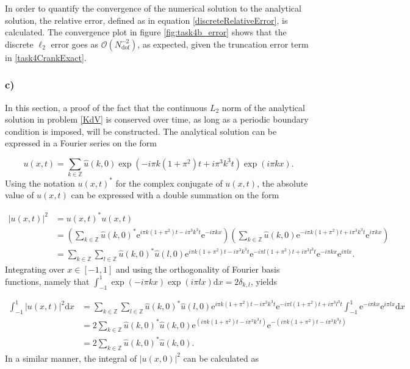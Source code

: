 In order to quantify the convergence of the numerical solution to the analytical solution, the relative error, defined as in equation \eqref{discreteRelativeError}, is calculated. The convergence plot in figure \ref{fig:task4b_error} shows that the discrete $\ell_2$ error goes as $\mathcal{O}(N_{\mathrm{dof}}^{-2})$, as expected, given the truncation error term in \eqref{task4CrankExact}.

\subsubsection{c)}
In this section, a proof of the fact that the continuous $L_2$ norm of the analytical solution in problem \eqref{KdV} is conserved over time, as long as a periodic boundary condition is imposed, will be constructed. The analytical solution can be expressed in a Fourier series on the form

\begin{equation*}
    u(x,t) = \sum_{k \in \mathbb{Z}}\widehat{u}(k,0)\exp{(-i\pi k(1+\pi^2)t + i\pi^3k^3t)}\exp{(i\pi kx)}.
\end{equation*}
Using the notation $u(x,t)^*$ for the complex conjugate of $u(x,t)$, the absolute value of $u(x,t)$ can be expressed with a double summation on the form 

\begin{equation*}
    \begin{split}
        |u(x,t)|^2 &= u(x,t)^* u(x,t) \\ &= \left(\sum_{k \in \mathbb{Z}}\widehat{u}(k,0)^* \mathrm{e}^{i\pi k(1+\pi^2)t - i\pi^3 k^3 t}\mathrm{e}^{-i\pi kx}\right) \left(\sum_{k \in \mathbb{Z}}\widehat{u}(k,0) \mathrm{e}^{-i\pi k(1+\pi^2)t +i\pi^3 k^3t}\mathrm{e}^{i\pi kx}\right) \\ &= \sum_{k\in \mathbb{Z}}\sum_{l \in \mathbb{Z}} \widehat{u}(k,0)^*\widehat{u}(l,0) \mathrm{e}^{i\pi k(1+\pi^2)t-i\pi^3 k^3t}\mathrm{e}^{-i\pi l(1+\pi^2)t+i\pi^3 l^3t }\mathrm{e}^{-i\pi kx}\mathrm{e}^{i\pi lx}.
    \end{split}
\end{equation*}
Integrating over $x \in [-1,1]$ and using the orthogonality of Fourier basis functions, namely that $\int_{-1}^{1} \exp{(-i\pi kx)}\exp{(i\pi lx)} \mathrm{d}x =2\delta_{k,l}$, yields

\begin{equation*}
    \begin{split}
        \int_{-1}^{1} |u(x,t)|^2 \mathrm{d}x &= \sum_{k\in \mathbb{Z}}\sum_{l \in \mathbb{Z}} \widehat{u}(k,0)^*\widehat{u}(l,0) \mathrm{e}^{i\pi k(1+\pi^2)t-i\pi^3 k^3t}\mathrm{e}^{-i\pi l(1+\pi^2)t+i\pi^3 l^3t } \int_{-1}^{1} \mathrm{e}^{-i\pi kx}\mathrm{e}^{i\pi lx} \mathrm{d}x \\ &= 2\sum_{k \in \mathbb{Z}} \widehat{u}(k,0)^*\widehat{u}(k,0) \mathrm{e}^{(i\pi k(1+\pi^2)t-i\pi^3 k^3t)} \mathrm{e}^{-(i\pi k(1+\pi^2)t-i\pi^3 k^3t)} \\ &= 2 \sum_{k \in \mathbb{Z}} \widehat{u}(k,0)^* \widehat{u}(k,0).
    \end{split}
\end{equation*}
In a similar manner, the integral of $|u(x,0)|^2$ can be calculated as 

